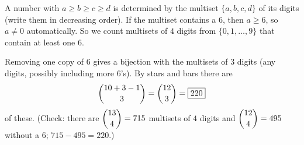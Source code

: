 A number with $a\ge b\ge c\ge d$ is determined by the multiset $\{a,b,c,d\}$ of its digits (write them in decreasing order). If the multiset contains a $6$, then $a\ge6$, so $a\ne0$ automatically. So we count multisets of $4$ digits from $\{0,1,\dots,9\}$ that contain at least one $6$.

Removing one copy of $6$ gives a bijection with the multisets of $3$ digits (any digits, possibly including more $6$'s). By stars and bars there are
\[\dbinom{10+3-1}{3}=\dbinom{12}{3}=\boxed{220}\]
of these. (Check: there are $\dbinom{13}{4}=715$ multisets of $4$ digits and $\dbinom{12}{4}=495$ without a $6$; $715-495=220$.)
